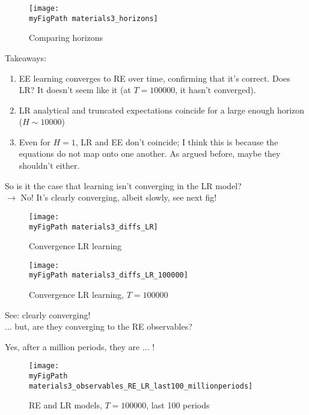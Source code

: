 \documentclass[11pt]{article}
\def \myFigPath {../figures/}
\renewcommand{\[}{\begin{equation}}
\renewcommand{\]}{\end{equation}}
\def\myBiggerFigScale{0.4}
\def\myFigScale{0.3}
\begin{document}
\newpage
\begin{figure}[h!]
\texttt{[image: \\myFigPath materials3\_horizons]}
\caption{Comparing horizons}
\end{figure}

Takeaways:
\begin{enumerate}
\item EE learning converges to RE over time, confirming that it's correct. Does LR? It doesn't seem like it (at $T=100000$, it hasn't converged).
\item LR analytical and truncated expectations coincide for a large enough horizon ($H \sim 10000$)
\item Even for $H=1$, LR and EE don't coincide; I think this is because the equations do not map onto one another. As argued before, maybe they shouldn't either.
\end{enumerate}

\newpage
So is it the case that learning isn't converging in the LR model? \\
$\rightarrow$ No! It's clearly converging, albeit slowly, see next fig!

\begin{figure}[h!]
\texttt{[image: \\myFigPath materials3\_diffs\_LR]}
\caption{Convergence LR learning}
\end{figure}

\begin{figure}[h!]
\texttt{[image: \\myFigPath materials3\_diffs\_LR\_100000]}
\caption{Convergence LR learning, $T = 100000$}
\end{figure}

See: clearly converging!  \\

... but, are they converging to the RE observables?
\newpage

%
Yes, after a million periods, they are ... !
\begin{figure}[h!]
\texttt{[image: \\myFigPath materials3\_observables\_RE\_LR\_last100\_millionperiods]}
\caption{RE and LR models, $T = 100000$, last 100 periods}
\end{figure}
\end{document}

